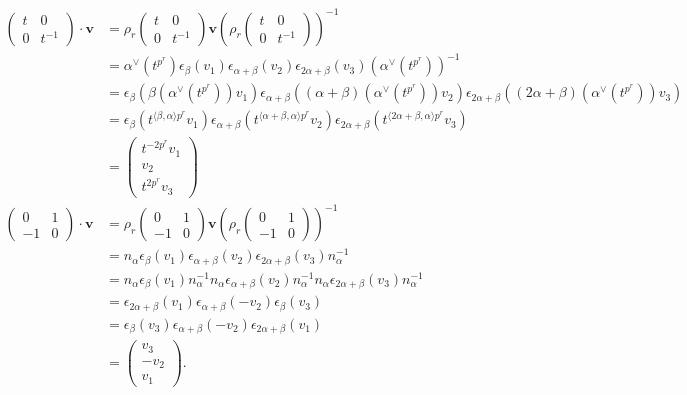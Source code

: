 \begin{align*}
\left(\begin{matrix} t & 0 \\ 0 & t^{-1}\end{matrix}\right) \cdot \mathbf{v}
&=
\rho_r\left(\begin{matrix}t & 0 \\ 0 & t^{-1}\end{matrix}\right) \mathbf{v} \left(\rho_r\left(\begin{matrix}t & 0 \\ 0 & t^{-1}\end{matrix}\right)\right)^{-1} \\
&=
\alpha^\vee(t^{p^r})\epsilon_\beta(v_1)\epsilon_{\alpha+\beta}(v_2)\epsilon_{2\alpha+\beta}(v_3)\left(\alpha^\vee(t^{p^r})\right)^{-1} \\
&=
\epsilon_\beta\left(\beta(\alpha^\vee(t^{p^r}))v_1\right)\epsilon_{\alpha+\beta}\left((\alpha+\beta)(\alpha^\vee(t^{p^r}))v_2\right)\epsilon_{2\alpha+\beta}\left((2\alpha+\beta)(\alpha^\vee(t^{p^r}))v_3\right) \\
&=
\epsilon_\beta\left(t^{\langle\beta,\alpha\rangle p^r}v_1\right)\epsilon_{\alpha+\beta}\left(t^{\langle\alpha+\beta,\alpha\rangle p^r}v_2\right)\epsilon_{2\alpha+\beta}\left(t^{\langle2\alpha+\beta,\alpha\rangle p^r}v_3\right) \\
&=
\left(\begin{matrix} t^{-2p^r}v_1 \\ v_2 \\ t^{2p^r}v_3 \end{matrix}\right) \\
\left(\begin{matrix} 0 & 1 \\ -1 & 0 \end{matrix}\right) \cdot \mathbf{v} 
&=
\rho_r\left(\begin{matrix} 0 & 1 \\ -1 & 0\end{matrix}\right) \mathbf{v}\left( \rho_r\left(\begin{matrix} 0 & 1 \\ -1 & 0\end{matrix}\right)\right)^{-1} \\
&= 
n_ \alpha  \epsilon_ \beta (v_1)\epsilon_{\alpha+\beta}(v_2) \epsilon_{2\alpha+\beta}(v_3) n_ \alpha^{-1}\\
&= 
n_ \alpha  \epsilon_\beta (v_1) n_ \alpha^{-1}n_ \alpha \epsilon_{\alpha+\beta}(v_2) n_ \alpha^{-1} n_ \alpha \epsilon_{2\alpha+\beta}(v_3) n_ \alpha^{-1}\\
&= 
\epsilon_{2\alpha+\beta} (v_1) \epsilon_{\alpha+\beta}(-v_2)  \epsilon_{\beta}(v_3) \\
&= 
\epsilon_{\beta}(v_3) \epsilon_{\alpha+\beta}(-v_2) \epsilon_{2\alpha+\beta} (v_1)\\
&= \left(\begin{matrix} v_3 \\ -v_2 \\ v_1 \end{matrix}\right).
\end{align*}
